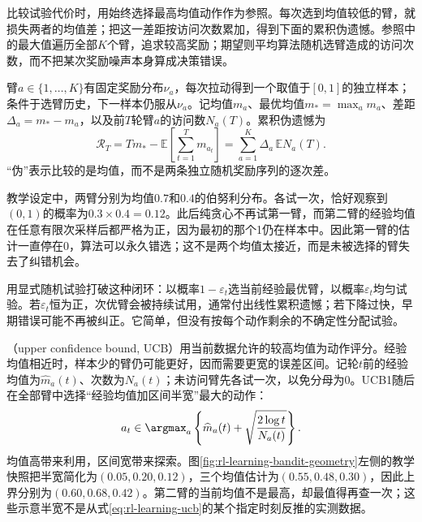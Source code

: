 比较试验代价时，用始终选择最高均值动作作为参照。每次选到均值较低的臂，就损失两者的均值差；把这一差距按访问次数累加，得到下面的累积伪遗憾。参照中的最大值遍历全部$K$个臂，追求较高奖励；期望则平均算法随机选臂造成的访问次数，而不把某次奖励噪声本身算成决策错误。

\begin{definition}[有界随机老虎机]
  \label{def:rl-learning-stochastic-bandit}
  臂$a\in\{1,\ldots,K\}$有固定奖励分布$\nu_a$，每次拉动得到一个取值于$[0,1]$的独立样本；条件于选臂历史，下一样本仍服从$\nu_a$。记均值$m_a$、最优均值$m_*=\max_a m_a$、差距$\Delta_a=m_*-m_a$，以及前$T$轮臂$a$的访问数$N_a(T)$。累积伪遗憾为
  \begin{equation}
    \mathcal R_T
    =T m_*-\mathbb E\!\left[\sum_{t=1}^T m_{a_t}\right]
    =\sum_{a=1}^K\Delta_a\,\mathbb E N_a(T).
    \label{eq:rl-learning-bandit-regret}
  \end{equation}
  “伪”表示比较的是均值，而不是两条独立随机奖励序列的逐次差。
\end{definition}

\begin{example}[一次噪声如何锁住贪心策略]
  \label{ex:rl-learning-greedy-trap}
  教学设定中，两臂分别为均值$0.7$和$0.4$的伯努利分布。各试一次，恰好观察到$(0,1)$的概率为$0.3\times0.4=0.12$。此后纯贪心不再试第一臂，而第二臂的经验均值在任意有限次采样后都严格为正，因为最初的那个1仍在样本中。因此第一臂的估计一直停在0，算法可以永久错选；这不是两个均值太接近，而是未被选择的臂失去了纠错机会。
\end{example}

用显式随机试验打破这种闭环：以概率$1-\varepsilon_t$选当前经验最优臂，以概率$\varepsilon_t$均匀试验。若$\varepsilon_t$恒为正，次优臂会被持续试用，通常付出线性累积遗憾；若下降过快，早期错误可能不再被纠正。它简单，但没有按每个动作剩余的不确定性分配试验。

（upper confidence bound, UCB）用当前数据允许的较高均值为动作评分。经验均值相近时，样本少的臂仍可能更好，因而需要更宽的误差区间。记轮$t$前的经验均值为$\widehat m_a(t)$、次数为$N_a(t)$；未访问臂先各试一次，以免分母为0。UCB1随后在全部臂中选择“经验均值加区间半宽”最大的动作：
\begin{equation}
  a_t\in\argmax_a\left\{\widehat m_a(t)
    +\sqrt{\frac{2\log t}{N_a(t)}}\right\}.
  \label{eq:rl-learning-ucb}
\end{equation}
均值高带来利用，区间宽带来探索。图\ref{fig:rl-learning-bandit-geometry}左侧的教学快照把半宽简化为$(0.05,0.20,0.12)$，三个均值估计为$(0.55,0.48,0.30)$，因此上界分别为$(0.60,0.68,0.42)$。第二臂的当前均值不是最高，却最值得再查一次；这些示意半宽不是从式\eqref{eq:rl-learning-ucb}的某个指定时刻反推的实测数据。

